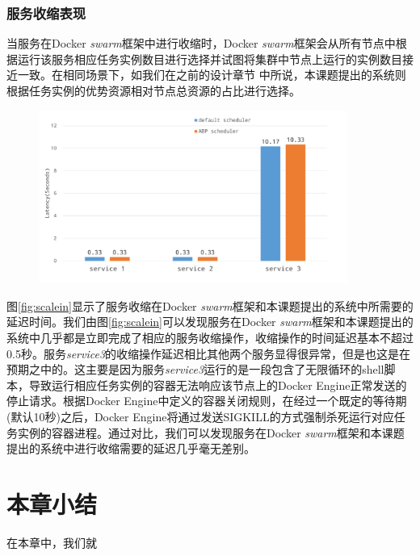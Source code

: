 \subsubsection{服务收缩表现}\label{sec:scalein}

当服务在Docker \emph{swarm}框架中进行收缩时，Docker \emph{swarm}框架会从所有节点中根据运行该服务相应任务实例数目进行选择并试图将集群中节点上运行的实例数目接近一致。在相同场景下，如我们在之前的设计章节%
中所说，本课题提出的系统则根据任务实例的优势资源相对节点总资源的占比进行选择。

\begin{figure}[htbp]
\centering
\includegraphics[width=0.9\textwidth]{./figure/scalein}
\end{figure}

图\ref{fig:scalein}显示了服务收缩在Docker \emph{swarm}框架和本课题提出的系统中所需要的延迟时间。我们由图\ref{fig:scalein}可以发现服务在Docker \emph{swarm}框架和本课题提出的系统中几乎都是立即完成了相应的服务收缩操作，收缩操作的时间延迟基本不超过0.5秒。服务\emph{service3}的收缩操作延迟相比其他两个服务显得很异常，但是也这是在预期之中的。这主要是因为服务\emph{service3}运行的是一段包含了无限循环的shell脚本，导致运行相应任务实例的容器无法响应该节点上的Docker Engine正常发送的停止请求。根据Docker Engine中定义的容器关闭规则，在经过一个既定的等待期(默认10秒)之后，Docker Engine将通过发送SIGKILL的方式强制杀死运行对应任务实例的容器进程。通过对比，我们可以发现服务在Docker \emph{swarm}框架和本课题提出的系统中进行收缩需要的延迟几乎毫无差别。

\section{本章小结}
在本章中，我们就

